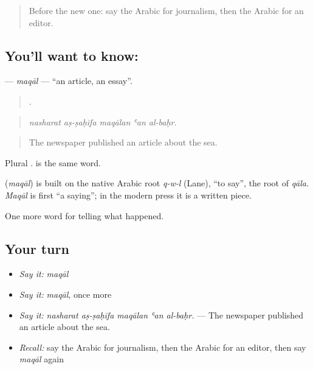\label{lesson:AR-C296-maqal}



\begin{quote}
Before the new one: say the Arabic for journalism, then the Arabic for an editor.
\end{quote}

\subsection*{You'll want to know: }
\textbf{} — \emph{maqāl} — \textquotedblleft{}an article, an essay\textquotedblright{}.

\begin{quote}
    .
\end{quote}

\begin{quote}
\emph{nasharat aṣ-ṣaḥīfa maqālan ʿan al-baḥr.}
\end{quote}

\begin{quote}
The newspaper published an article about the sea.
\end{quote}

Plural .  is the same word.

\begin{cousinweb}
\textbf{} (\emph{maqāl}) is built on the native Arabic root \emph{q-w-l} (Lane), \textquotedblleft{}to say\textquotedblright{}, the root of \emph{qāla}. \emph{Maqāl} is first \textquotedblleft{}a saying\textquotedblright{}; in the modern press it is a written piece.
\end{cousinweb}

\begin{grammarlens}[title={What you've built}]
One more word for telling what happened.
\end{grammarlens}

\subsection*{Your turn}
\begin{itemize}
\raggedright
  \item \emph{Say it:} \emph{maqāl}
  \item \emph{Say it:} \emph{maqāl}, once more
  \item \emph{Say it:} \emph{nasharat aṣ-ṣaḥīfa maqālan ʿan al-baḥr.} — The newspaper published an article about the sea.
  \item \emph{Recall:} say the Arabic for journalism, then the Arabic for an editor, then say \emph{maqāl} again
\end{itemize}

